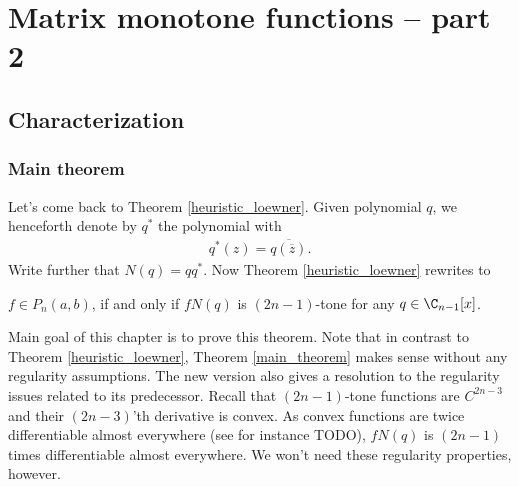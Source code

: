 \chapter{Matrix monotone functions -- part 2}

\section{Characterization}

\subsection{Main theorem}

Let's come back to Theorem \ref{heuristic_loewner}. Given polynomial $q$, we henceforth denote by $q^{*}$ the polynomial with
\begin{align*}
	q^{*}(z) = \overline{q(\overline{z})}.
\end{align*}
Write further that $N(q) = q q^{*}$. Now Theorem  \ref{heuristic_loewner} rewrites to

\begin{lause}\label{main_theorem}
	$f \in P_{n}(a, b)$, if and only if $f N(q)$ is $(2 n - 1)$-tone for any $q \in \C_{n - 1}[x]$.
\end{lause}

Main goal of this chapter is to prove this theorem. Note that in contrast to Theorem \ref{heuristic_loewner}, Theorem \ref{main_theorem} makes sense without any regularity assumptions. The new version also gives a resolution to the regularity issues related to its predecessor. Recall that $(2 n - 1)$-tone functions are $C^{2 n - 3}$ and their $(2 n - 3)$'th derivative is convex. As convex functions are twice differentiable almost everywhere (see for instance TODO), $f N(q)$ is $(2 n - 1)$ times differentiable almost everywhere. We won't need these regularity properties, however.

